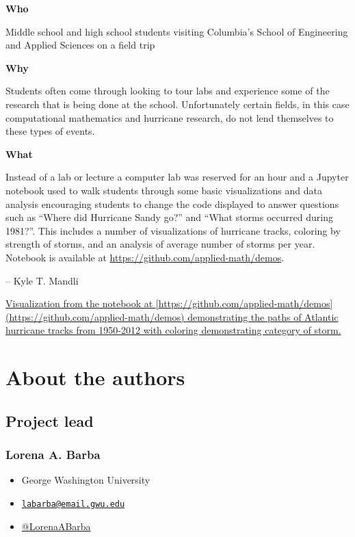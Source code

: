 \documentclass[]{book}
\providecommand{\tightlist}{%
  \setlength{\itemsep}{0pt}\setlength{\parskip}{0pt}}
\begin{document}
\textbf{Who }

Middle school and high school students visiting Columbia's School of
Engineering and Applied Sciences on a field trip

\textbf{Why }

Students often come through looking to tour labs and experience some of
the research that is being done at the school. Unfortunately certain
fields, in this case computational mathematics and hurricane research,
do not lend themselves to these types of events.

\textbf{What }

Instead of a lab or lecture a computer lab was reserved for an hour and
a Jupyter notebook used to walk students through some basic
visualizations and data analysis encouraging students to change the code
displayed to answer questions such as ``Where did Hurricane Sandy go?''
and ``What storms occurred during 1981?''. This includes a number of
visualizations of hurricane tracks, coloring by strength of storms, and
an analysis of average number of storms per year. Notebook is available
at \url{https://github.com/applied-math/demos}.

-- Kyle T. Mandli

\href{images/hurricanes.png}{Visualization from the notebook at
{[}https://github.com/applied-math/demos{]}(https://github.com/applied-math/demos)
demonstrating the paths of Atlantic hurricane tracks from 1950-2012 with
coloring demonstrating category of storm.}

\hypertarget{authors}{\chapter{About the authors}\label{authors}}

\section{Project lead}\label{project-lead}

\subsection{Lorena A. Barba}\label{lorena-a.-barba}

\begin{itemize}
\tightlist
\item
  George Washington University
\item
  \href{mailto:labarba@email.gwu.edu}{\nolinkurl{labarba@email.gwu.edu}}
\item
  \href{https://twitter.com/LorenaABarba}{@LorenaABarba}
\end{itemize}
\end{document}
